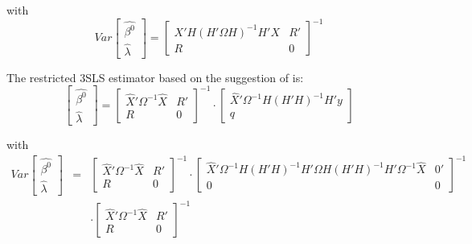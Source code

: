 \documentclass[article]{jss}
\begin{document}
with
\begin{equation}
   Var 
   \left[ \begin{array}{c}
      \widehat{\beta^0} \\ \widehat{\lambda}
   \end{array} \right] 
   = 
   \left[ \begin{array}{cc}
      X' H \left( H' \Omega H \right)^{-1} H' X & R' \\ 
      R & 0
   \end{array} \right]^{-1}
\end{equation}


The restricted 3SLS estimator based on the suggestion of 
\cite{schmidt90} is:
\begin{equation}
   \left[ \begin{array}{c}
      \widehat{\beta^0} \\ \widehat{\lambda}
   \end{array} \right]
   =
   \left[ \begin{array}{cc}
      \widehat{X}' \Omega^{-1} \widehat{X} & R' \\ 
      R & 0
   \end{array} \right]^{-1}
   \cdot
   \left[ \begin{array}{c}
      \widehat{X}' \Omega^{-1} H \left( H' H \right)^{-1} H' y \\ q 
   \end{array} \right]
\end{equation}

with
\begin{eqnarray}
   Var 
   \left[ \begin{array}{c}
      \widehat{\beta^0} \\ \widehat{\lambda}
   \end{array} \right] 
   & = & 
   \left[ \begin{array}{cc}
      \widehat{X}' \Omega^{-1} \widehat{X} & R' \\ 
      R & 0
   \end{array} \right]^{-1}
   \cdot
   \left[ \begin{array}{cc}
      \widehat{X}' \Omega^{-1} H \left( H' H \right)^{-1} H' \Omega
      H \left( H' H \right)^{-1} H' \Omega^{-1} \widehat{X} & 0' \\ 
      0 & 0
   \end{array} \right]^{-1}
   \nonumber \\
   & & \cdot
   \left[ \begin{array}{cc}
      \widehat{X}' \Omega^{-1} \widehat{X} & R' \\ 
      R & 0
   \end{array} \right]^{-1}
\end{eqnarray}
\end{document}
